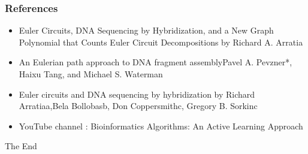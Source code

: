 \documentclass{beamer}
\begin{document}
\begin{frame}
\frametitle{References}
\begin{itemize}
\item Euler Circuits, DNA Sequencing by Hybridization, and a New Graph Polynomial that Counts Euler Circuit Decompositions by Richard A. Arratia
\item An Eulerian path approach to DNA fragment assemblyPavel A. Pevzner*, Haixu Tang, and Michael S. Waterman
\item Euler circuits and DNA sequencing by hybridization by Richard Arratiaa,Bela Bollobasb, Don Coppersmithc, Gregory B. Sorkinc 
\item YouTube channel : Bioinformatics Algorithms: An Active Learning Approach
\end{itemize}
\end{frame}


\begin{frame}
\Huge{\centerline{The End}}
\end{frame}

\end{document}
